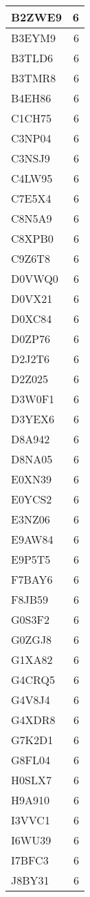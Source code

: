 \documentclass[
]{book}
\theoremstyle{definition}
\theoremstyle{definition}
\theoremstyle{definition}
\theoremstyle{definition}
\theoremstyle{remark}
\begin{document}
\begin{table}
\begin{tabular}{l|r}
\hline
B2ZWE9 & 6\\
\hline
B3EYM9 & 6\\
\hline
B3TLD6 & 6\\
\hline
B3TMR8 & 6\\
\hline
B4EH86 & 6\\
\hline
C1CH75 & 6\\
\hline
C3NP04 & 6\\
\hline
C3NSJ9 & 6\\
\hline
C4LW95 & 6\\
\hline
C7E5X4 & 6\\
\hline
C8N5A9 & 6\\
\hline
C8XPB0 & 6\\
\hline
C9Z6T8 & 6\\
\hline
D0VWQ0 & 6\\
\hline
D0VX21 & 6\\
\hline
D0XC84 & 6\\
\hline
D0ZP76 & 6\\
\hline
D2J2T6 & 6\\
\hline
D2Z025 & 6\\
\hline
D3W0F1 & 6\\
\hline
D3YEX6 & 6\\
\hline
D8A942 & 6\\
\hline
D8NA05 & 6\\
\hline
E0XN39 & 6\\
\hline
E0YCS2 & 6\\
\hline
E3NZ06 & 6\\
\hline
E9AW84 & 6\\
\hline
E9P5T5 & 6\\
\hline
F7BAY6 & 6\\
\hline
F8JB59 & 6\\
\hline
G0S3F2 & 6\\
\hline
G0ZGJ8 & 6\\
\hline
G1XA82 & 6\\
\hline
G4CRQ5 & 6\\
\hline
G4V8J4 & 6\\
\hline
G4XDR8 & 6\\
\hline
G7K2D1 & 6\\
\hline
G8FL04 & 6\\
\hline
H0SLX7 & 6\\
\hline
H9A910 & 6\\
\hline
I3VVC1 & 6\\
\hline
I6WU39 & 6\\
\hline
I7BFC3 & 6\\
\hline
J8BY31 & 6\\

\end{tabular}
\end{table}
\end{document}
